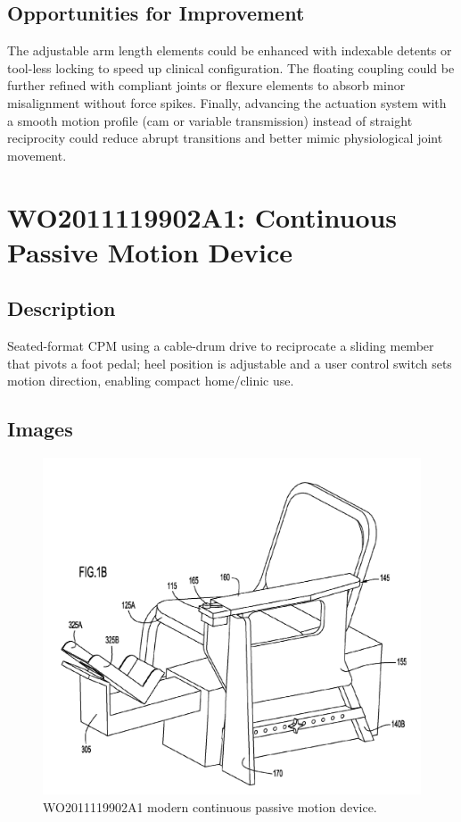 \documentclass[11pt]{article}
\begin{document}
\subsection{Opportunities for Improvement}
The adjustable arm length elements could be enhanced with indexable detents or tool-less locking to speed up clinical configuration. The floating coupling could be further refined with compliant joints or flexure elements to absorb minor misalignment without force spikes. Finally, advancing the actuation system with a smooth motion profile (cam or variable transmission) instead of straight reciprocity could reduce abrupt transitions and better mimic physiological joint movement.

\section{WO2011119902A1: Continuous Passive Motion Device}
\subsection{Description}
Seated-format CPM using a cable-drum drive to reciprocate a sliding member that pivots a foot pedal; heel position is adjustable and a user control switch sets motion direction, enabling compact home/clinic use.
\subsection{Images}
\begin{figure}[H]
  \centering
  \includegraphics[width=0.54\linewidth]{WO2011119902A1.png}
  \caption{WO2011119902A1 modern continuous passive motion device.}
  \label{fig:WO2011119902A1}
\end{figure}
\end{document}
